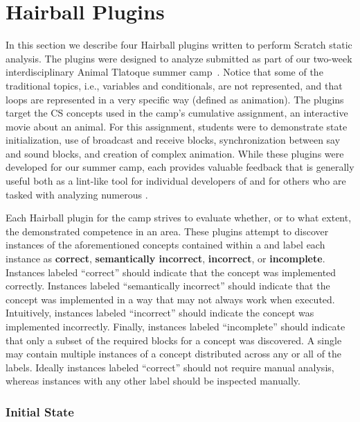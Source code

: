\section{Hairball Plugins} 
In this section we describe four Hairball plugins written to perform Scratch
static analysis.  The plugins were designed to analyze  submitted
as part of our two-week interdisciplinary Animal Tlatoque summer
camp~\cite{Franklin:2013:SBO}.  Notice that some of the traditional topics,
i.e., variables and conditionals, are not represented, and that loops are
represented in a very specific way (defined as animation). The plugins target
the CS concepts used in the camp's cumulative assignment, an interactive movie
about an animal. For this assignment, students were to demonstrate state
initialization, use of broadcast and receive blocks, synchronization between
say and sound blocks, and creation of complex animation. While these plugins
were developed for our summer camp, each provides valuable feedback that is
generally useful both as a lint-like tool for individual developers of
 and for others who are tasked with analyzing numerous
.

Each Hairball plugin for the camp strives to evaluate whether, or to what
extent, the \sprogram{} demonstrated competence in an area. These plugins
attempt to discover instances of the aforementioned concepts contained within a
\sprogram{} and label each instance as {\bf correct}, {\bf semantically
  incorrect}, {\bf incorrect}, or {\bf incomplete}. Instances labeled
``correct'' should indicate that the concept was implemented
correctly. Instances labeled ``semantically incorrect'' should indicate that
the concept was implemented in a way that may not always work when
executed. Intuitively, instances labeled ``incorrect'' should indicate the
concept was implemented incorrectly. Finally, instances labeled ``incomplete''
should indicate that only a subset of the required blocks for a concept was
discovered. A single \sprogram{} may contain multiple instances of a concept
distributed across any or all of the labels. Ideally instances labeled
``correct'' should not require manual analysis, whereas instances with any
other label should be inspected manually.


\subsubsection*{Initial State}

